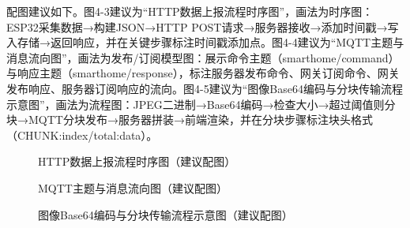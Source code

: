 \par 配图建议如下。图4-3建议为“HTTP数据上报流程时序图”，画法为时序图：ESP32采集数据→构建JSON→HTTP POST请求→服务器接收→添加时间戳→写入存储→返回响应，并在关键步骤标注时间戳添加点。图4-4建议为“MQTT主题与消息流向图”，画法为发布/订阅模型图：展示命令主题（smarthome/command）与响应主题（smarthome/response），标注服务器发布命令、网关订阅命令、网关发布响应、服务器订阅响应的流向。图4-5建议为“图像Base64编码与分块传输流程示意图”，画法为流程图：JPEG二进制→Base64编码→检查大小→超过阈值则分块→MQTT分块发布→服务器拼装→前端渲染，并在分块步骤标注块头格式（CHUNK:index/total:data）。
\begin{figure}[H]
\centering
{}
\caption{HTTP数据上报流程时序图（建议配图）}
\label{fig:http_sequence}
\end{figure}
\begin{figure}[H]
\centering
{}
\caption{MQTT主题与消息流向图（建议配图）}
\label{fig:mqtt_topics}
\end{figure}
\begin{figure}[H]
\centering
{}
\caption{图像Base64编码与分块传输流程示意图（建议配图）}
\label{fig:image_transmission}
\end{figure}
